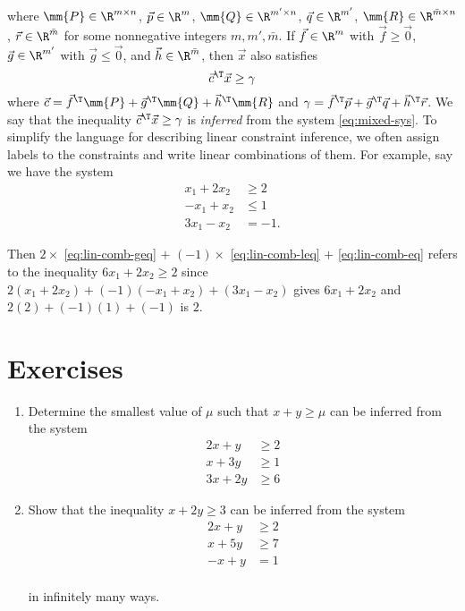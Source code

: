where \(\mm{P} \in \R^{m \times n}\), \(\vec{p} \in \R^m\),
\(\mm{Q} \in \R^{m' \times n}\), \(\vec{q} \in \R^{m'}\),
\(\mm{R} \in \R^{\bar{m} \times n}\), \(\vec{r} \in \R^{\bar{m}}\) for
some nonnegative integers \(m, m', \bar{m}\). If \(\vec{f} \in \R^m\)
with \(\vec{f} \geq \vec{0}\), \(\vec{g} \in \R^{m'}\) with
\(\vec{g} \leq \vec{0}\), and \(\vec{h} \in \R^{\bar{m}}\), then
\(\vec{x}\) also satisfies \[ \vec{c}^\T \vec{x} \geq \gamma\] where
\(\vec{c} =  \vec{f}^\T\mm{P}+ \vec{g}^\T \mm{Q} +\vec{h}^\T \mm{R}\)
and
\(\gamma =  \vec{f}^\T\vec{p}+ \vec{g}^\T \vec{q} +\vec{h}^\T \vec{r}\).
We say that the inequality \(\vec{c}^\T \vec{x} \geq \gamma\) is
\emph{inferred} from the system \eqref{eq:mixed-sys}. To simplify the
language for describing linear constraint inference, we often assign
labels to the constraints and write linear combinations of them. For
example, say we have the system
\begin{align}
x_1 + 2x_2 & \geq 2  \label{eq:lin-comb-geq} \\
-x_1 + x_2 & \leq 1  \label{eq:lin-comb-leq} \\
3x_1 - x_2 & = -1.  \label{eq:lin-comb-eq}
\end{align}

Then \(2\times\) \eqref{eq:lin-comb-geq} \(+\) \((-1)\times\)
\eqref{eq:lin-comb-leq} \(+\) \eqref{eq:lin-comb-eq} refers to the
inequality \(6x_1+2x_2 \geq 2\) since
\(2(x_1+2x_2)+(-1)(-x_1+x_2)+(3x_1 - x_2)\) gives \(6x_1 + 2x_2\) and
\(2(2) + (-1)(1) + (-1)\) is \(2\).

\section*{Exercises}\label{exercises-2}

\begin{enumerate}
\def\labelenumi{\arabic{enumi}.}
\tightlist
\item
  Determine the smallest value of \(\mu\) such that \(x + y \geq \mu\)
  can be inferred from the system
  \begin{align*}
  2x + y & \geq 2 \\
  x + 3y & \geq 1 \\
  3x + 2y & \geq 6
  \end{align*}
\item
  Show that the inequality \(x + 2y \geq 3\) can be inferred from the
  system
  \begin{align*}
  2x + y & \geq 2 \\
  x + 5y & \geq 7 \\
  -x + y & = 1 \\
  \end{align*}

  in infinitely many ways.
\end{enumerate}

